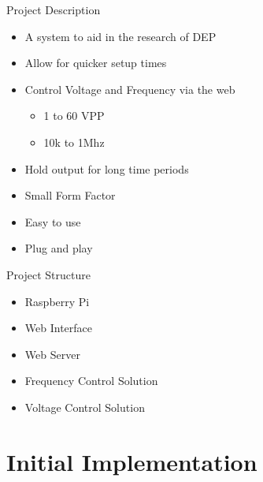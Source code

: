 \begin{frame}{Project Description}
  \begin{itemize}
    \item A system to aid in the research of DEP
    \item Allow for quicker setup times
    \item Control Voltage and Frequency via the web
      \begin{itemize}
        \item 1 to 60 VPP
        \item 10k to 1Mhz
      \end{itemize}
    \item Hold output for long time periods
    \item Small Form Factor
    \item Easy to use
    \item Plug and play
  \end{itemize}
\end{frame}

\begin{frame}{Project Structure}
  \begin{itemize}
    \item Raspberry Pi
    \item Web Interface
    \item Web Server
    \item Frequency Control Solution
    \item Voltage Control Solution
  \end{itemize}
\end{frame}

\section{Initial Implementation}

